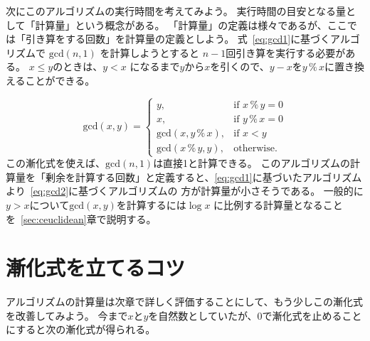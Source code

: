 \documentclass[a4paper,oneside,onecolumn,openany,article,10pt]{memoir}
\theoremstyle{remark}
\begin{document}
次にこのアルゴリズムの実行時間を考えてみよう。
実行時間の目安となる量として「計算量」という概念がある。
「計算量」の定義は様々であるが、ここでは「引き算をする回数」を計算量の定義としよう。
式~\eqref{eq:gcd1}に基づくアルゴリズムで $\mathrm{gcd}(n, 1)$ を計算しようとすると $n-1$回引き算を実行する必要がある。
$x\le y$のときは、$y < x$ になるまで$y$から$x$を引くので、$y-x$を$y\,\%\,x$に置き換えることができる。

\begin{equation}
\mathrm{gcd}(x, y) =
\begin{cases}
y,& \text{if } x \,\%\, y = 0\\
x,& \text{if } y \,\%\, x = 0\\
\mathrm{gcd}(x, y\, \%\, x),& \text{if } x< y\\
\mathrm{gcd}(x\, \%\, y, y),& \text{otherwise.}
\end{cases}
\label{eq:gcd2}
\end{equation}
この漸化式を使えば、$\mathrm{gcd}(n,1)$は直接1と計算できる。
このアルゴリズムの計算量を「剰余を計算する回数」と定義すると、\eqref{eq:gcd1}に基づいたアルゴリズムより~\eqref{eq:gcd2}に基づくアルゴリズムの
方が計算量が小さそうである。
一般的に$y>x$について$\mathrm{gcd}(x, y)$を計算するには$\log x$ に比例する計算量となることを~\ref{sec:ceuclidean}章で説明する。

\section{漸化式を立てるコツ}
アルゴリズムの計算量は次章で詳しく評価することにして、もう少しこの漸化式を改善してみよう。
今まで$x$と$y$を自然数としていたが、0で漸化式を止めることにすると次の漸化式が得られる。
\end{document}
